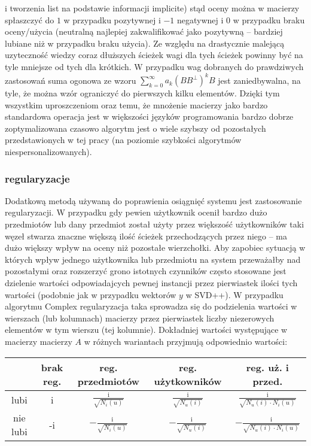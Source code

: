 \documentclass{pracamgr}
\begin{document}
    i tworzenia list na podstawie informacji implicite) stąd oceny można w macierzy spłaszczyć do $1$ w przypadku pozytywnej i $-1$ negatywnej
    i $0$ w przypadku braku oceny/użycia (neutralną najlepiej zakwalifikować jako pozytywną -- bardziej lubiane niż w przypadku braku użycia).
    Ze względu na drastycznie malejącą uzyteczność wiedzy coraz dłuższych ścieżek wagi dla tych ścieżek powinny być na tyle mniejsze od tych dla krótkich.
    W przypadku wag dobranych do prawdziwych zastosowań suma ogonowa ze wzoru $\sum\limits_{k=0}^{\infty}a_k(BB^\bot)^kB$ jest zaniedbywalna, na tyle,
    że można wzór ograniczyć do pierwszych kilku elementów.\newline
    Dzięki tym wszystkim uproszczeniom oraz temu,
    że mnożenie macierzy jako bardzo standardowa operacja jest w większości języków programowania bardzo dobrze zoptymalizowana czasowo algorytm
    jest o wiele szybszy od pozostałych przedstawionych w tej pracy (na poziomie szybkości algorytmów niespersonalizowanych).
    \subsubsection{regularyzacje}
     Dodatkową metodą używaną do poprawienia osiągnięć systemu jest zastosowanie regularyzacji.
     W przypadku gdy pewien użytkownik ocenił bardzo dużo przedmiotów lub dany przedmiot został użyty przez większość użytkowników taki węzeł
     stwarza znaczne większą ilość ścieżek przechodzących przez niego -- ma dużo większy wpływ na oceny niż pozostałe wierzchołki.
     Aby zapobiec sytuacją w których wpływ jednego użytkownika lub przedmiotu na system przeważałby nad pozostałymi oraz rozszerzyć
     grono istotnych czynników często stosowane jest dzielenie wartości odpowiadajcych pewnej instancji przez pierwiastek ilości tych wartości
     (podobnie jak w przypadku wektorów $y$ w SVD++).
     W przypadku algorytmu Complex regularyzacja taka sprowadza się do podzielenia wartości w wierszach (lub kolumnach) macierzy przez pierwiastek liczby
     niezerowych elementów w tym wierszu (tej kolumnie). Dokładniej wartości występujące w macierzy macierzy $A$ w różnych wariantach przyjmują odpowiednio
     wartości:\newline
     \begin{tabular}{|c|c|c|c|c|}
      \hline
         & brak reg. & reg. przedmiotów & reg. użytkowników & reg. uż. i przed. \\
      \hline
      lubi & i &  $\frac{\text{i}}{\sqrt{N_{i}(u)}}$& $\frac{\text{i}}{\sqrt{N_{u}(i)}}$ & $\frac{\text{i}}{\sqrt{N_{u}(i)\cdot N_{i}(u)}}$  \\
      \hline
      nie lubi & -i & $-\frac{\text{i}}{\sqrt{N_{i}(u)}}$ &  $-\frac{\text{i}}{\sqrt{N_{u}(i)}}$ & $-\frac{\text{i}}{\sqrt{N_{u}(i)\cdot N_{i}(u)}}$  \\    
      \hline
     \end{tabular}
    
\end{document}
